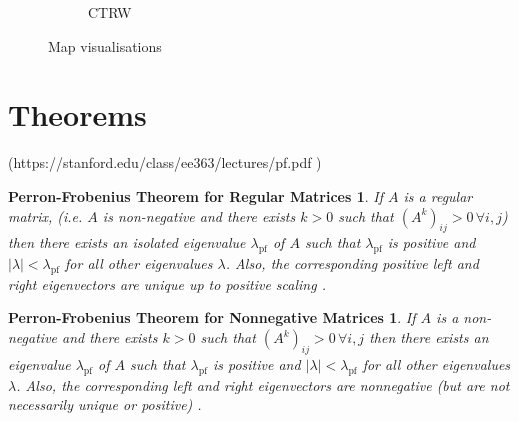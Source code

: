 \documentclass[12pt,a4paper]{article}
\newtheorem{theorem1}{Perron-Frobenius Theorem for Regular Matrices}
\newtheorem{theorem2}{Perron-Frobenius Theorem for Nonnegative Matrices}
\begin{document}
\begin{figure}[H]
\begin{subfigure}[b]{0.4\textwidth}
    \caption{CTRW}
    \label{fig:map_dynsim}
  \end{subfigure}
  \caption{Map visualisations }
  \label{fig:maps}
\end{figure}

\section{Theorems}
(https://stanford.edu/class/ee363/lectures/pf.pdf )
\begin{theorem1}
  If $A$ is a regular matrix, (i.e. $A$ is non-negative and there exists $k>0$ such that $(A^k)_{i j} > 0\, \forall i,j$) then there exists an isolated eigenvalue $\lambda_{\text{pf}}$ of $A$ such that $\lambda_{\text{pf}}$ is positive and $|\lambda|<\lambda_{\text{pf}}$ for all other eigenvalues $\lambda$. Also, the corresponding positive left and right eigenvectors are unique up to positive scaling \cite{boydnotes}.
\end{theorem1}
\begin{theorem2}
  If $A$ is a non-negative and there exists $k>0$ such that $(A^k)_{i j} > 0\, \forall i,j$ then there exists an eigenvalue $\lambda_{\text{pf}}$ of $A$ such that $\lambda_{\text{pf}}$ is positive and $|\lambda|<\lambda_{\text{pf}}$ for all other eigenvalues $\lambda$. Also, the corresponding left and right eigenvectors are nonnegative (but are not necessarily unique or positive) \cite{boydnotes}.
\end{theorem2}



\cite{lambiotte2019networks}
\cite{lambiottenotes}
\end{document}
